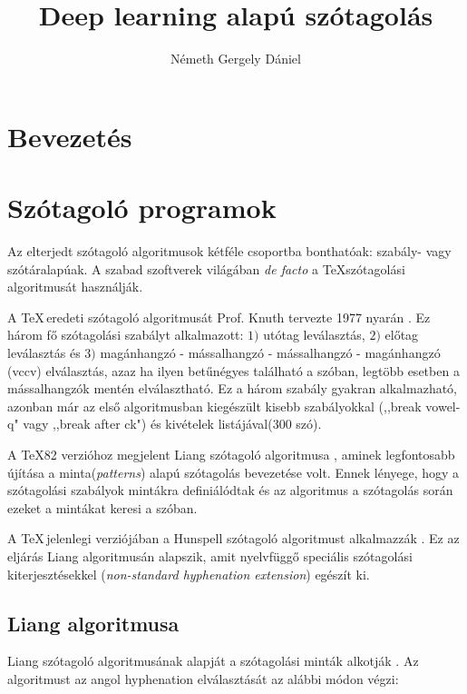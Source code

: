 \documentclass[a4paper, magyar]{article}
\title{Deep learning alapú szótagolás}
\author{N{\'e}meth Gergely D{\'a}niel}
\date{}
\begin{document}
\selectfont
\maketitle
{}
\begin{abstract}

\end{abstract}
\begin{abstract}
	
\end{abstract}
\newpage
\tableofcontents
\newpage
\section{Bevezetés}
\section{Szótagoló programok}
Az elterjedt szótagoló algoritmusok kétféle csoportba bonthatóak: szabály- vagy szótáralapúak. A szabad szoftverek világában \textit{de facto} a \TeX szótagolási algoritmusát használják.

A \TeX\,eredeti szótagoló algoritmusát Prof. Knuth tervezte 1977 nyarán \cite{knuth1979tex}. Ez három fő szótagolási szabályt alkalmazott: $1)$ utótag leválasztás, $2)$ előtag leválasztás és $3)$ magánhangzó - mássalhangzó - mássalhangzó - magánhangzó (vccv) elválasztás, azaz ha ilyen betűnégyes található a szóban, legtöbb esetben a mássalhangzók mentén elválasztható. Ez a három szabály gyakran alkalmazható, azonban már az első algoritmusban kiegészült kisebb szabályokkal (,,break vowel-q" vagy ,,break after ck") és kivételek listájával(300 szó).

A \TeX82 verzióhoz megjelent Liang szótagoló algoritmusa \cite{liang1983word}, aminek legfontosabb újítása a minta(\textit{patterns}) alapú szótagolás bevezetése volt. Ennek lényege, hogy a szótagolási szabályok mintákra definiálódtak és az algoritmus a szótagolás során ezeket a mintákat keresi a szóban.

A \TeX\,jelenlegi verziójában a Hunspell szótagoló algoritmust alkalmazzák \cite{nemeth2006automatic}. Ez az eljárás Liang algoritmusán alapszik, amit nyelvfüggő speciális szótagolási kiterjesztésekkel (\textit{non-standard hyphenation extension}) egészít ki.
\subsection{Liang algoritmusa}
Liang szótagoló algoritmusának alapját a szótagolási minták alkotják \cite{liang1983word}. Az algoritmust az angol 
{\selectfont
	hyphenation%
} elválasztását az alábbi módon végzi:
\end{document}
